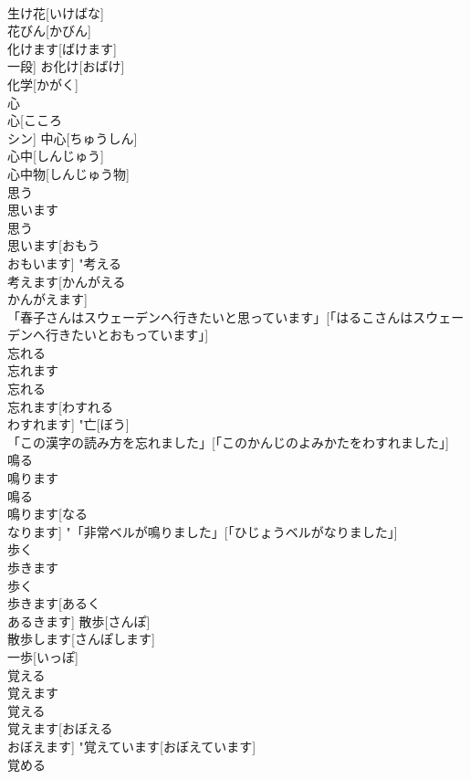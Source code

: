 \documentclass[8pt]{extreport}
\begin{document}
\begin{CJK}{UTF8}{min}
\\	生け花[いけばな] 
\\	花びん[かびん] 
\\	化けます[ばけます] 
\\	一段] お化け[おばけ] 
\\	化学[かがく] 
\\	心	
\\	心[こころ 
\\	シン]	中心[ちゅうしん] 
\\	心中[しんじゅう] 
\\	心中物[しんじゅう物] 
\\	思う 
\\	思います	
\\	思う 
\\	思います[おもう 
\\	おもいます]	"考える 
\\	考えます[かんがえる 
\\	かんがえます] 
\\	「春子さんはスウェーデンへ行きたいと思っています」[「はるこさんはスウェーデンへ行きたいとおもっています」] 
\\	忘れる 
\\	忘れます	
\\	忘れる 
\\	忘れます[わすれる 
\\	わすれます]	"亡[ぼう] 
\\	「この漢字の読み方を忘れました」[「このかんじのよみかたをわすれました」] 
\\	鳴る 
\\	鳴ります	
\\	鳴る 
\\	鳴ります[なる 
\\	なります]	"「非常ベルが鳴りました」[「ひじょうベルがなりました」] 
\\	歩く 
\\	歩きます	
\\	歩く 
\\	歩きます[あるく 
\\	あるきます]	散歩[さんぽ] 
\\	散歩します[さんぽします] 
\\	一歩[いっぽ] 
\\	覚える 
\\	覚えます	
\\	覚える 
\\	覚えます[おぼえる 
\\	おぼえます]	"覚えています[おぼえています] 
\\	覚める 

\end{CJK}
\end{document}

